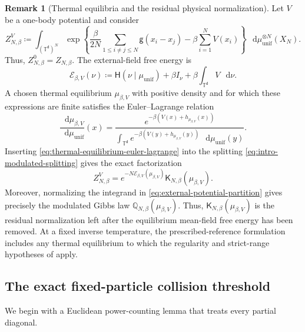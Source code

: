 \documentclass[11pt,reqno]{amsart}
\numberwithin{equation}{section}
\theoremstyle{plain}
\theoremstyle{definition}
\newtheorem{remark}[remark]{Remark}
\renewcommand{\d}{\mathsf d}
\newcommand{\dd}{\mathop{}\!\mathrm d}
\newcommand{\T}{\mathbb T}
\newcommand{\Q}{\mathbb Q}
\newcommand{\be}{\beta}
\newcommand{\g}{\mathsf g}
\newcommand{\K}{\mathsf K}
\newcommand{\Hr}{\mathsf H}
\newcommand{\Ec}{\mathcal E}
\newcommand{\muunif}{\mu_{\mathrm{unif}}}
\newcommand{\XN}{X_N}
\begin{document}
\begin{remark}[Thermal equilibria and the residual physical normalization]
\label{rem:thermal-equilibrium-factorization}
Let $V$ be a one-body potential and consider
\begin{equation}
 Z_{N,\be}^{V}
 \coloneqq\int_{(\T^{\d})^N}
 \exp\left\{\frac{\be}{2N}\sum_{1\leq i\neq j\leq N}\g(x_i-x_j)
 -\be\sum_{i=1}^NV(x_i)\right\}
 \,\dd\muunif^{\otimes N}(\XN).
 \label{eq:external-potential-partition}
\end{equation}
Thus, $Z_{N,\be}^{0}=Z_{N,\be}$. The external-field free energy is
\begin{equation}
 \Ec_{\be,V}(\nu)
 \coloneqq\Hr(\nu\mid\muunif)+\be I_{\nu}+\be\int_{\T^{\d}}V\,\dd\nu.
 \label{eq:external-macroscopic-free-energy}
\end{equation}
A chosen thermal equilibrium $\mu_{\be,V}$ with positive density and for which these expressions are finite satisfies the Euler--Lagrange relation
\begin{equation}
 \frac{\dd\mu_{\be,V}}{\dd\muunif}(x)
 =\frac{e^{-\be(V(x)+h_{\mu_{\be,V}}(x))}}
 {\displaystyle\int_{\T^{\d}}e^{-\be(V(y)+h_{\mu_{\be,V}}(y))}\,\dd\muunif(y)}.
 \label{eq:thermal-equilibrium-euler-lagrange}
\end{equation}
Inserting \eqref{eq:thermal-equilibrium-euler-lagrange} into the splitting \eqref{eq:intro-modulated-splitting} gives the exact factorization
\begin{equation}
 Z_{N,\be}^{V}
 =e^{-N\Ec_{\be,V}(\mu_{\be,V})}\K_{N,\be}(\mu_{\be,V}).
 \label{eq:thermal-equilibrium-factorization}
\end{equation}
Moreover, normalizing the integrand in \eqref{eq:external-potential-partition} gives precisely the modulated Gibbs law $\Q_{N,\be}(\mu_{\be,V})$.  Thus, $\K_{N,\be}(\mu_{\be,V})$ is the residual normalization left after the equilibrium mean-field free energy has been removed.  At a fixed inverse temperature, the prescribed-reference formulation includes any thermal equilibrium to which the regularity and strict-range hypotheses of  apply.

\end{remark}

\subsection{The exact fixed-particle collision threshold}
\label{subsec:fixed-particle-collisions}

We begin with a Euclidean power-counting lemma that treats every partial diagonal.
\end{document}
